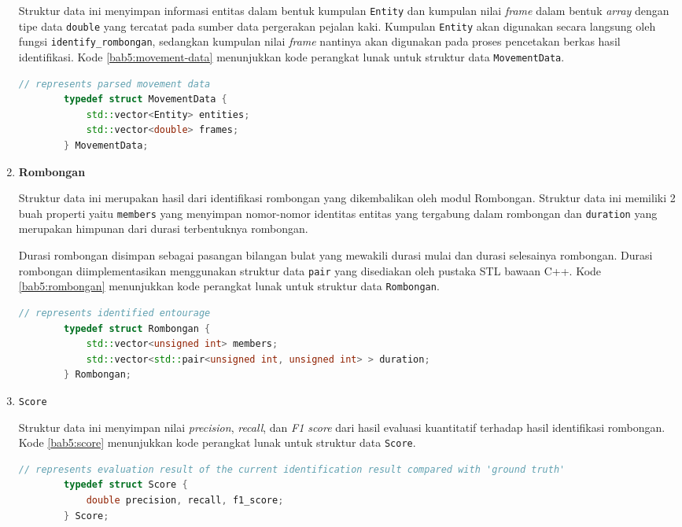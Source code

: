 \begin{enumerate}
    Struktur data ini menyimpan informasi entitas dalam bentuk kumpulan \texttt{Entity} dan kumpulan nilai \textit{frame} dalam bentuk \textit{array} dengan tipe data \texttt{double} yang tercatat pada sumber data pergerakan pejalan kaki. Kumpulan \texttt{Entity} akan digunakan secara langsung oleh fungsi \texttt{identify\_rombongan}, sedangkan kumpulan nilai \textit{frame} nantinya akan digunakan pada proses pencetakan berkas hasil identifikasi. Kode \ref{bab5:movement-data} menunjukkan kode perangkat lunak untuk struktur data \texttt{MovementData}.
    
    \begin{lstlisting}[language=C++, caption=Implementasi \texttt{MovementData}, label={bab5:movement-data}]
        // represents parsed movement data
        typedef struct MovementData {
            std::vector<Entity> entities;
            std::vector<double> frames;
        } MovementData;
    \end{lstlisting}
    
    \item \textbf{Rombongan}
    
    Struktur data ini merupakan hasil dari identifikasi rombongan yang dikembalikan oleh modul Rombongan. Struktur data ini memiliki 2 buah properti yaitu \texttt{members} yang menyimpan nomor-nomor identitas entitas yang tergabung dalam rombongan dan \texttt{duration} yang merupakan himpunan dari durasi terbentuknya rombongan.
    
    Durasi rombongan disimpan sebagai pasangan bilangan bulat yang mewakili durasi mulai dan durasi selesainya rombongan. Durasi rombongan diimplementasikan menggunakan struktur data \texttt{pair} yang disediakan oleh pustaka STL bawaan C++. Kode \ref{bab5:rombongan} menunjukkan kode perangkat lunak untuk struktur data \texttt{Rombongan}.
    
    \clearpage
    
    \begin{lstlisting}[language=C++, caption=Implementasi \texttt{Rombongan}, label={bab5:rombongan}]
        // represents identified entourage
        typedef struct Rombongan {
            std::vector<unsigned int> members;
            std::vector<std::pair<unsigned int, unsigned int> > duration;
        } Rombongan;
    \end{lstlisting}
    
    \item \texttt{Score}
    
    Struktur data ini menyimpan nilai \textit{precision}, \textit{recall}, dan \textit{F1 score} dari hasil evaluasi kuantitatif terhadap hasil identifikasi rombongan. Kode \ref{bab5:score} menunjukkan kode perangkat lunak untuk struktur data \texttt{Score}.
    
    \begin{lstlisting}[language=C++, caption=Implementasi \texttt{Score}, label={bab5:score}]
        // represents evaluation result of the current identification result compared with 'ground truth'
        typedef struct Score {
            double precision, recall, f1_score;
        } Score;
    \end{lstlisting}
\end{enumerate}